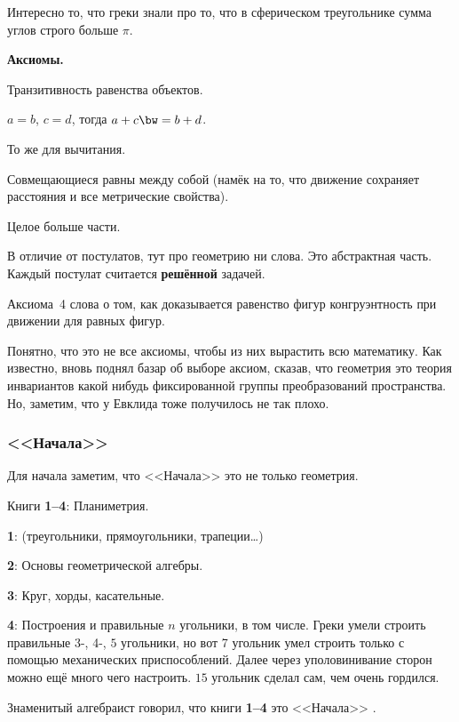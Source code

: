 \documentclass[a4paper,oneside,fleqn,10pt]{article}
\begin{document}
Интересно то, что греки знали про то, что в сферическом треугольнике
сумма углов строго больше $\pi$.

\textbf{Аксиомы.}
\begin{nums}{-2}
\item Транзитивность равенства объектов.
\item ${a=b}$, ${c=d}$, тогда $a+c\bw=b+d$.
\item То же для вычитания.
\item Совмещающиеся равны между собой (намёк на то, что движение сохраняет
расстояния и все метрические свойства).
\item Целое больше части.
\end{nums}

В отличие от постулатов, тут про геометрию ни слова. Это абстрактная часть.
Каждый постулат считается \textbf{решённой} задачей.

Аксиома~4 слова о том, как доказывается равенство фигур конгруэнтность
при движении для равных фигур.

Понятно, что это не все аксиомы, чтобы из них вырастить всю математику.
Как известно,  вновь поднял базар об выборе аксиом,
сказав, что геометрия это теория инвариантов какой нибудь фиксированной группы
преобразований пространства.
Но, заметим, что у Евклида тоже получилось не так плохо.

\subsubsection{<<Начала>>}

Для начала заметим, что <<Начала>> это не только геометрия.

Книги \textbf{1--4}: Планиметрия.

\textbf{1}: (треугольники, прямоугольники, трапеции\ldots)

\textbf{2}: Основы геометрической алгебры.

\textbf{3}: Круг, хорды, касательные.

\textbf{4}: Построения и правильные $n$ угольники, в том числе.
Греки умели строить правильные 3-, 4-, $5$ угольники, но вот 7 угольник
 умел строить только с помощью механических приспособлений.
Далее через уполовинивание сторон можно ещё много чего настроить.
$15$ угольник  сделал сам, чем очень гордился.

Знаменитый алгебраист  говорил, что книги \textbf{1--4}
это <<Начала>> .
\end{document}
